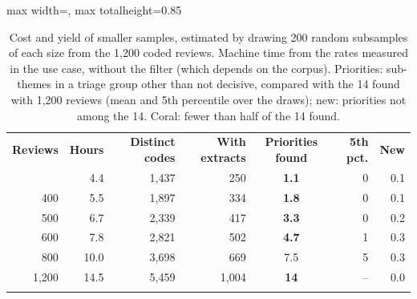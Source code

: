 \begin{table}[ht]
  \centering
  \small
  \caption{Cost and yield of smaller samples, estimated by drawing 200 random subsamples of each size from the 1,200 coded reviews. Machine time from the rates measured in the use case, without the filter (which depends on the corpus). Priorities: sub-themes in a triage group other than not decisive, compared with the 14 found with 1,200 reviews (mean and 5th percentile over the draws); new: priorities not among the 14. \colorbox{prNeg}{Coral}: fewer than half of the 14 found.}
  \label{tab:samplesize}
  \setlength{\tabcolsep}{4pt}
  \renewcommand{\arraystretch}{1.15}
  \setlength{\aboverulesep}{0pt}
  \setlength{\belowrulesep}{0pt}
  \setlength{\dashlinedash}{2pt}
  \setlength{\dashlinegap}{2pt}
  \begin{adjustbox}{max width=\linewidth, max totalheight=0.85\textheight}
  \begin{tabular}{r r r r c r r}
    \toprule
    \rowcolor{prHead}
    \textbf{Reviews} & \textbf{Hours} & \textbf{Distinct codes} & \textbf{With extracts} & \textbf{Priorities found} & \textbf{5th pct.} & \textbf{New} \\
    \arrayrulecolor{black}\midrule
    300 & 4.4 & 1{,}437 & 250 & \cellcolor{prNeg}\textbf{1.1} & 0 & 0.1 \\
    400 & 5.5 & 1{,}897 & 334 & \cellcolor{prNeg}\textbf{1.8} & 0 & 0.1 \\
    500 & 6.7 & 2{,}339 & 417 & \cellcolor{prNeg}\textbf{3.3} & 0 & 0.2 \\
    600 & 7.8 & 2{,}821 & 502 & \cellcolor{prNeg}\textbf{4.7} & 1 & 0.3 \\
    800 & 10.0 & 3{,}698 & 669 & 7.5 & 5 & 0.3 \\
    1{,}200 & 14.5 & 5{,}459 & 1{,}004 & \cellcolor{prPos}\textbf{14} & -- & 0.0 \\
    \arrayrulecolor{black}\bottomrule
  \end{tabular}
  \end{adjustbox}
\end{table}
